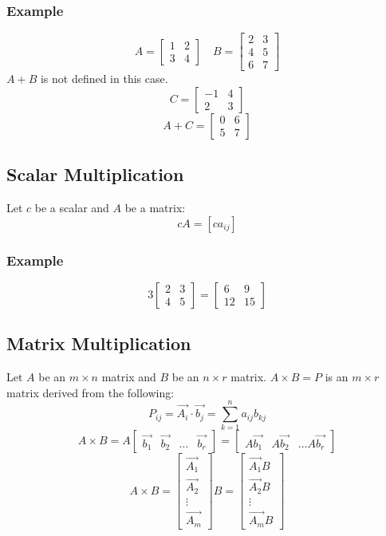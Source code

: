 \documentclass{math}
\begin{document}
\subsubsection*{Example}
\[ A = \begin{bmatrix}1 & 2 \\ 3 & 4\end{bmatrix} \quad
  B = \begin{bmatrix}2 & 3 \\ 4 & 5 \\ 6 & 7\end{bmatrix} \]
\( A+B \) is not defined in this case.
\[ C = \begin{bmatrix}-1 & 4 \\ 2 & 3\end{bmatrix} \]
\[ A+C = \begin{bmatrix}0 & 6 \\ 5 & 7\end{bmatrix} \]

\subsection*{Scalar Multiplication}
Let \( c \) be a scalar and \( A \) be a matrix:
\[ cA = [ca_{ij}] \]

\subsubsection*{Example}
\[ 3\begin{bmatrix}2 & 3 \\ 4 & 5\end{bmatrix} =
  \begin{bmatrix}6 & 9 \\ 12 & 15\end{bmatrix} \]

\subsection*{Matrix Multiplication}
Let \( A \) be an \( m\times n \) matrix and \( B \) be an \( n\times r \)
matrix. \( A\times B = P \) is an \( m\times r \) matrix derived from
the following:
\[ P_{ij} = \vec{A_i}\cdot\vec{b_{j}} = \sum_{k=1}^{n}a_{ij}b_{kj} \]
\[ A\times B = A\begin{bmatrix}\vec{b_1} & \vec{b_2} & \dots &
  \vec{b_r}\end{bmatrix} = \begin{bmatrix}A\vec{b_1} & A\vec{b_2} & \dots
  A\vec{b_r}\end{bmatrix} \]
\[ A\times B = \begin{bmatrix}\vec{A_1} \\ \vec{A_2} \\ \vdots \\ \vec{A_m}
  \end{bmatrix}B = \begin{bmatrix}\vec{A_1}B \\ \vec{A_2}B \\ \vdots \\
  \vec{A_m}B\end{bmatrix} \]
\end{document}
